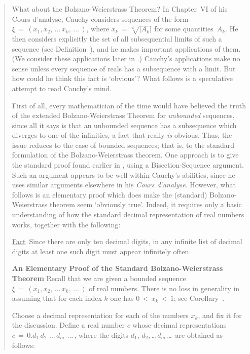 \begin{quotation}
{        What about the Bolzano-Weierstrass Theorem? In Chapter~VI of his {\cal Cours d'analyse},
    Cauchy considers sequences of the form ${\xi} \,=\, (x_{1}, x_{2},\,{\ldots}\,x_{k},\,{\ldots}\,)$,
    where $x_{k} \,=\, \sqrt[k]{|A_{k}|}$ for some quantities~$A_{k}$. He then considers explicitly
    the set of all subsequential limits of such a sequence (see Definition~),
    and he makes important applications of them. (We consider these applications later in {\ThisText}.)
    Cauchy's applications make no sense unless every sequence of reals has a subsequence with a limit. But how could he think this fact is `obvious'?
    What follows is a speculative attempt to read Cauchy's mind.

        First of all, every mathematician of the time would have believed the truth of the extended Bolzano-Weierstrass Theorem for {\em unbounded} sequences,
    since all it says is that an unbounded sequence has a subsequence which diverges to one of the infinities, a fact that really {\em is} obvious.
    Thus, the issue reduces to the case of bounded sequences; that is, to the standard formulation of the Bolzano-Weierstrass theorem.
    One approach is to give the standard proof found earlier in {\ThisText}, using a Bisection-Sequence argument.
    Such an argument appears to be well within Cauchy's abilities, since he uses similar arguments elsewhere in his {\em Cours d'analyse}.
    However, what follows is an elementary proof which does make the (standard) Bolzano-Weierstrass theorem seem `obviously true'.
    Indeed, it requires only a basic understanding of how the standard decimal representation of real numbers works, together with the following:

    \underline{Fact}\, Since there are only ten decimal digits, in any infinite list of decimal digits at least one such digit must appear infinitely often.

\V

        {\bf An Elementary Proof of the Standard Bolzano-Weierstrass Theorem} Recall that we are given a bounded sequence
    ${\xi} \,=\, (x_{1}, x_{2},\,{\ldots}\,x_{k}, \,{\ldots}\,)$ of real numbers.
    There is no loss in generality in assuming that for each index $k$ one has $0\,<\,x_{k}\,<\,1$; see Corollary~.

        Choose a decimal representation for each of the numbers $x_{k}$, and fix it for the discussion.
    Define a real number $c$ whose decimal representations $c \,=\, 0.d_{1}\,d_{2}\,\,{\ldots}\,d_{m}\,\,{\ldots}\,$,
    where the digits $d_{1}$, $d_{2}$,\,{\ldots}\,$d_{m}$\,{\ldots}\, are obtained as follows:

}
\end{quotation}
